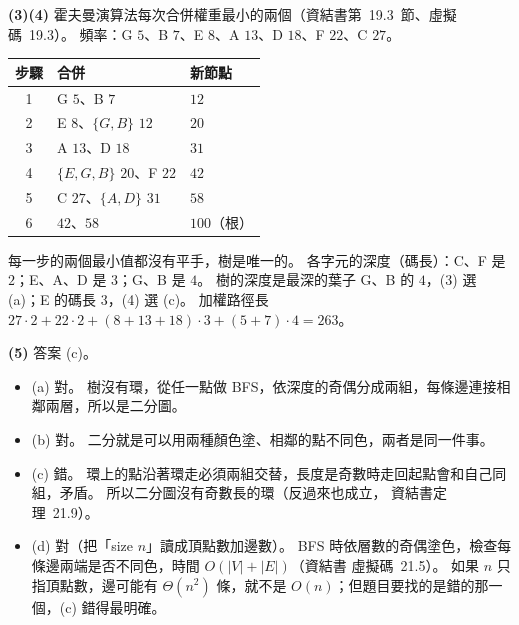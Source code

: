 \begin{pastsoln}
\textbf{(3)(4)} 霍夫曼演算法每次合併權重最小的兩個（資結書第~19.3~節、虛擬碼~19.3）。 頻率：G $5$、B $7$、E $8$、A $13$、D $18$、F $22$、C $27$。
\begin{center}
\begin{tabular}{cll}
\toprule
步驟 & 合併 & 新節點 \\
\midrule
1 & G $5$、B $7$ & $12$ \\
2 & E $8$、$\{G, B\}$ $12$ & $20$ \\
3 & A $13$、D $18$ & $31$ \\
4 & $\{E, G, B\}$ $20$、F $22$ & $42$ \\
5 & C $27$、$\{A, D\}$ $31$ & $58$ \\
6 & $42$、$58$ & $100$（根） \\
\bottomrule
\end{tabular}
\end{center}
每一步的兩個最小值都沒有平手，樹是唯一的。 各字元的深度（碼長）：C、F 是 $2$；E、A、D 是 $3$；G、B 是 $4$。 樹的深度是最深的葉子
G、B 的 $4$，(3) 選 (a)；E 的碼長 $3$，(4) 選 (c)。 加權路徑長 $27 \cdot 2 + 22 \cdot 2 + (8 + 13 + 18) \cdot 3 + (5 + 7) \cdot 4 = 263$。

\textbf{(5)} 答案 (c)。
\begin{itemize}
\item (a) 對。 樹沒有環，從任一點做 BFS，依深度的奇偶分成兩組，每條邊連接相鄰兩層，所以是二分圖。
\item (b) 對。 二分就是可以用兩種顏色塗、相鄰的點不同色，兩者是同一件事。
\item (c) 錯。 環上的點沿著環走必須兩組交替，長度是奇數時走回起點會和自己同組，矛盾。 所以二分圖沒有奇數長的環（反過來也成立，
資結書定理~21.9）。
\item (d) 對（把「size $n$」讀成頂點數加邊數）。 BFS 時依層數的奇偶塗色，檢查每條邊兩端是否不同色，時間 $O(|V| + |E|)$（資結書
虛擬碼~21.5）。 如果 $n$ 只指頂點數，邊可能有 $\Theta(n^2)$ 條，就不是 $O(n)$；但題目要找的是錯的那一個，(c) 錯得最明確。
\end{itemize}
\end{pastsoln}

